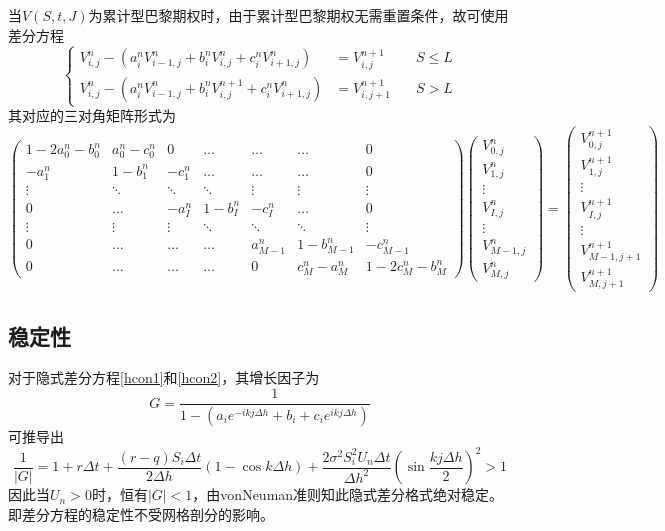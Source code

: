 \documentclass{ctexart} %
\begin{document}
当$V(S,t,J)$为累计型巴黎期权时，由于累计型巴黎期权无需重置条件，故可使用差分方程
\begin{equation}
\label{hcmu}
\left\{
\begin{aligned}
V^n_{i,j}-(a^n_iV^{n}_{i-1,j}+b^n_iV^{n}_{i,j}+c^n_iV^{n}_{i+1,j})&=V^{n+1}_{i,j} \quad &S\leq L \\
V^n_{i,j}-(a^n_iV^{n}_{i-1,j}+b^n_iV^{n+1}_{i,j}+c^n_iV^{n}_{i+1,j})&=V^{n+1}_{i,j+1} \quad &S > L 
\end{aligned}
\right.
\end{equation}
其对应的三对角矩阵形式为
\begin{equation}
\left(
\begin{matrix}
1-2a^n_0-b^n_0 & a^n_0-c^n_0 & 0       &\ldots  & \ldots &\ldots     & 0 \\
-a^n_1       & 1-b^n_1   & -c^n_1    &\ldots  & \ldots &\ldots     & 0       \\
\vdots     & \ddots  & \ddots  &\ddots  & \vdots & \vdots   & \vdots   \\
0          & \ldots  & -a^n_I    & 1-b^n_I  & -c^n_I    & \ldots  & 0    \\
\vdots     & \vdots  & \vdots  &\ddots  & \ddots & \ddots   & \vdots   \\
0          & \ldots  & \ldots  &\ldots  & a^n_{M-1} & 1-b^n_{M-1} & -c^n_{M-1}   \\
0          & \ldots  & \ldots  &\ldots  &0        & c^n_M-a^n_M & 1-2c^n_M-b^n_M      
\end{matrix}
\right)
\left(
\begin{matrix}
V_{0,j}^n\\
V_{1,j}^n\\
\vdots\\
V_{I,j}^n\\
\vdots\\
V_{M-1,j}^n\\
V_{M,j}^n
\end{matrix}
\right)
=
\left(
\begin{matrix}
V_{0,j}^{n+1}\\
V_{1,j}^{n+1}\\
\vdots\\
V_{I,j}^{n+1}\\
\vdots\\
V_{M-1,j+1}^{n+1}\\
V_{M,j+1}^{n+1}
\end{matrix}
\right)
\end{equation}
\subsection{稳定性}
对于隐式差分方程\eqref{hcon1}和\eqref{hcon2}，其增长因子为
\begin{equation}
G=\frac{1}{1-(a_ie^{-ikj\Delta h}+b_i+c_ie^{ikj\Delta h})}
\end{equation}
可推导出
\begin{equation}
\frac{1}{|G|}=1+r\Delta t+\frac{(r-q)S_i\Delta t}{2\Delta h}(1-\cos k\Delta h)+\frac{2\sigma^2S_i^2U_{n}\Delta t}{\Delta h^2}(\sin\frac{kj\Delta h}{2})^2>1
\end{equation}
因此当$U_n>0$时，恒有$|G|<1$，由vonNeuman准则知此隐式差分格式绝对稳定。即差分方程的稳定性不受网格剖分的影响。
\end{document}
